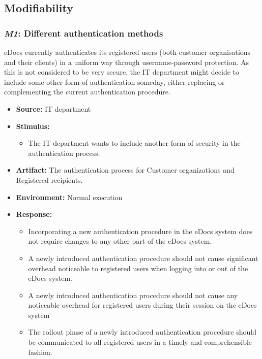 \documentclass[a4paper,10pt]{article}
\begin{document}
\subsection{Modifiability}
\subsubsection{\emph{M1}: Different authentication methods}
eDocs currently authenticates its registered users (both customer organisations and their clients) in a uniform way through username-password protection. As this is not considered to be very secure, the IT department might decide to include some other form of authentication someday, either replacing or complementing the current authentication procedure.

\begin{itemize}
    \item \textbf{Source:} IT department
    \item \textbf{Stimulus:}
        \begin{itemize}
            \item The IT department wants to include another form of security in the authentication process.
        \end{itemize}
    \item \textbf{Artifact:} The authentication process for Customer organizations and Registered recipients.
    \item \textbf{Environment:} Normal execution
    \item \textbf{Response:}
        \begin{itemize}
            \item Incorporating a new authentication procedure in the eDocs system does not require changes to any other part of the eDocs system.
            \item A newly introduced authentication procedure should not cause significant overhead noticeable to registered users when logging into or out of the eDocs system.
            \item A newly introduced authentication procedure should not cause any noticeable overhead for registered users during their session on the eDocs system
            \item The rollout phase of a newly introduced authentication procedure should be communicated to all registered users in a timely and comprehensible fashion.
        \end{itemize}


\end{itemize}
\end{document}
